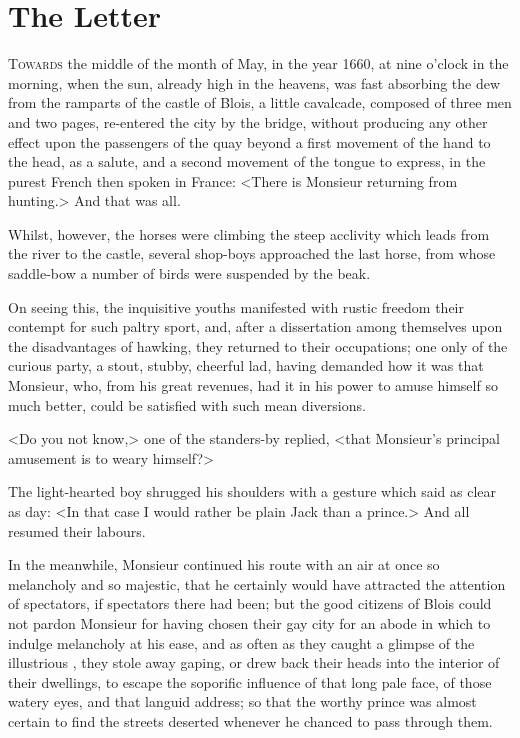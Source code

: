 \chapter{The Letter}

\lettrine{T}{owards} the middle of the month of May, in the year 1660, at nine o'clock in the morning, when the sun, already high in the heavens, was fast absorbing the dew from the ramparts of the castle of Blois, a little cavalcade, composed of three men and two pages, re-entered the city by the bridge, without producing any other effect upon the passengers of the quay beyond a first movement of the hand to the head, as a salute, and a second movement of the tongue to express, in the purest French then spoken in France: <There is Monsieur returning from hunting.> And that was all.

Whilst, however, the horses were climbing the steep acclivity which leads from the river to the castle, several shop-boys approached the last horse, from whose saddle-bow a number of birds were suspended by the beak.

On seeing this, the inquisitive youths manifested with rustic freedom their contempt for such paltry sport, and, after a dissertation among themselves upon the disadvantages of hawking, they returned to their occupations; one only of the curious party, a stout, stubby, cheerful lad, having demanded how it was that Monsieur, who, from his great revenues, had it in his power to amuse himself so much better, could be satisfied with such mean diversions.

<Do you not know,> one of the standers-by replied, <that Monsieur's principal amusement is to weary himself?>

The light-hearted boy shrugged his shoulders with a gesture which said as clear as day: <In that case I would rather be plain Jack than a prince.> And all resumed their labours.

In the meanwhile, Monsieur continued his route with an air at once so melancholy and so majestic, that he certainly would have attracted the attention of spectators, if spectators there had been; but the good citizens of Blois could not pardon Monsieur for having chosen their gay city for an abode in which to indulge melancholy at his ease, and as often as they caught a glimpse of the illustrious , they stole away gaping, or drew back their heads into the interior of their dwellings, to escape the soporific influence of that long pale face, of those watery eyes, and that languid address; so that the worthy prince was almost certain to find the streets deserted whenever he chanced to pass through them.

